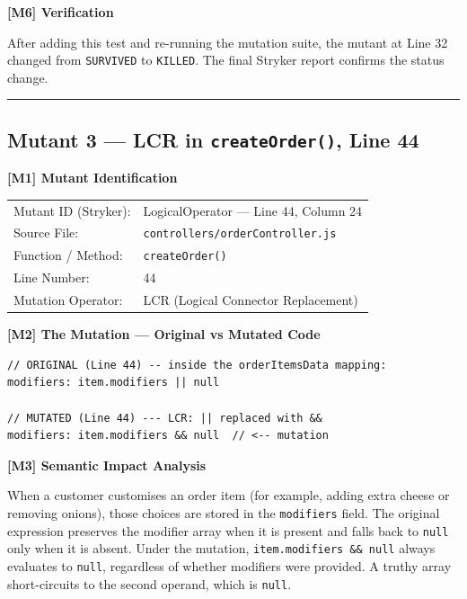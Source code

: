 \documentclass[12pt, a4paper]{article}
\begin{document}
\textbf{[M6] Verification}

After adding this test and re-running the mutation suite, the mutant at Line 32 changed from \texttt{SURVIVED} to \texttt{KILLED}. The final Stryker report confirms the status change.

\bigskip\hrule\bigskip

\subsection*{Mutant 3 --- LCR in \texttt{createOrder()}, Line 44}

\begin{mutantbox}
\textbf{[M1] Mutant Identification}\\[4pt]
\begin{tabular}{ll}
Mutant ID (Stryker):    & LogicalOperator --- Line 44, Column 24 \\
Source File:            & \texttt{controllers/orderController.js} \\
Function / Method:      & \texttt{createOrder()} \\
Line Number:            & 44 \\
Mutation Operator:      & LCR (Logical Connector Replacement) \\
\end{tabular}
\end{mutantbox}

\bigskip

\textbf{[M2] The Mutation --- Original vs Mutated Code}

\begin{lstlisting}[caption={Mutant 3: Original vs Mutated (Line 44)}]
// ORIGINAL (Line 44) -- inside the orderItemsData mapping:
modifiers: item.modifiers || null

// MUTATED (Line 44) --- LCR: || replaced with &&
modifiers: item.modifiers && null  // <-- mutation
\end{lstlisting}

\textbf{[M3] Semantic Impact Analysis}

When a customer customises an order item (for example, adding extra cheese or removing onions), those choices are stored in the \texttt{modifiers} field. The original expression preserves the modifier array when it is present and falls back to \texttt{null} only when it is absent. Under the mutation, \texttt{item.modifiers \&\& null} always evaluates to \texttt{null}, regardless of whether modifiers were provided. A truthy array short-circuits to the second operand, which is \texttt{null}.
\end{document}
